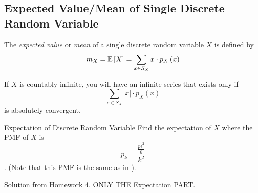 \subsection{Expected Value/Mean of Single Discrete Random Variable}\label{subsec:Expected Value of Single Discrete}
\begin{definition}\label{def:Expected Value of Single Discrete}
  The \emph{expected value} or \emph{mean} of a single discrete random variable $X$ is defined by
  \begin{equation}\label{eq:Expected Value of Single Discrete}
    m_{X} = \operatorname{\operatorname{\mathbb{E}}} \left[ X \right] = \sum_{x \in S_{X}} x \cdot p_{X} \left( x \right)
  \end{equation}
  \begin{remark}\label{rmk:Expected Value of Single Discrete Countably Infinite}
    If $X$ is countably infinite, you will have an infinite series that exists only if
    \begin{equation}\label{eq:Expected Value of Single Discrete Countably Infinite}
      \sum_{s \in S_{X}} \lvert x \rvert \cdot p_{X} \left( x \right)
    \end{equation}
    is absolutely convergent.
  \end{remark}
\end{definition}
\begin{example}[Problem 3.27]{Expectation of Discrete Random Variable}
  Find the expectation of $X$ where the PMF of $X$ is \[p_{k} = \frac{\frac{pi^{2}}{6}}{k^{2}}\]. (Note that this PMF is the same as in ).

  \tcblower

  Solution from Homework 4. ONLY THE Expectation PART.
\end{example}

